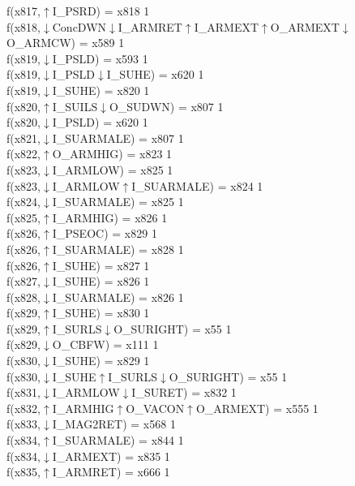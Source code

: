 f(x817,$\uparrow$I\_PSRD) = x818 {1} \\
f(x818,$\downarrow$ConcDWN$\downarrow$I\_ARMRET$\uparrow$I\_ARMEXT$\uparrow$O\_ARMEXT$\downarrow$O\_ARMCW) = x589 {1} \\
f(x819,$\downarrow$I\_PSLD) = x593 {1} \\
f(x819,$\downarrow$I\_PSLD$\downarrow$I\_SUHE) = x620 {1} \\
f(x819,$\downarrow$I\_SUHE) = x820 {1} \\
f(x820,$\uparrow$I\_SUILS$\downarrow$O\_SUDWN) = x807 {1} \\
f(x820,$\downarrow$I\_PSLD) = x620 {1} \\
f(x821,$\downarrow$I\_SUARMALE) = x807 {1} \\
f(x822,$\uparrow$O\_ARMHIG) = x823 {1} \\
f(x823,$\downarrow$I\_ARMLOW) = x825 {1} \\
f(x823,$\downarrow$I\_ARMLOW$\uparrow$I\_SUARMALE) = x824 {1} \\
f(x824,$\downarrow$I\_SUARMALE) = x825 {1} \\
f(x825,$\uparrow$I\_ARMHIG) = x826 {1} \\
f(x826,$\uparrow$I\_PSEOC) = x829 {1} \\
f(x826,$\uparrow$I\_SUARMALE) = x828 {1} \\
f(x826,$\uparrow$I\_SUHE) = x827 {1} \\
f(x827,$\downarrow$I\_SUHE) = x826 {1} \\
f(x828,$\downarrow$I\_SUARMALE) = x826 {1} \\
f(x829,$\uparrow$I\_SUHE) = x830 {1} \\
f(x829,$\uparrow$I\_SURLS$\downarrow$O\_SURIGHT) = x55 {1} \\
f(x829,$\downarrow$O\_CBFW) = x111 {1} \\
f(x830,$\downarrow$I\_SUHE) = x829 {1} \\
f(x830,$\downarrow$I\_SUHE$\uparrow$I\_SURLS$\downarrow$O\_SURIGHT) = x55 {1} \\
f(x831,$\downarrow$I\_ARMLOW$\downarrow$I\_SURET) = x832 {1} \\
f(x832,$\uparrow$I\_ARMHIG$\uparrow$O\_VACON$\uparrow$O\_ARMEXT) = x555 {1} \\
f(x833,$\downarrow$I\_MAG2RET) = x568 {1} \\
f(x834,$\uparrow$I\_SUARMALE) = x844 {1} \\
f(x834,$\downarrow$I\_ARMEXT) = x835 {1} \\
f(x835,$\uparrow$I\_ARMRET) = x666 {1} \\
